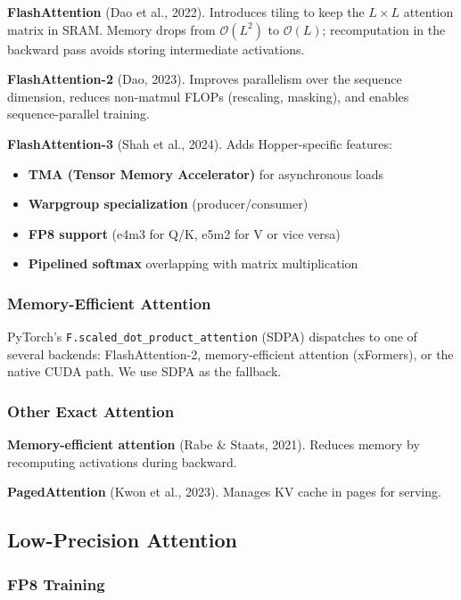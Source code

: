 \textbf{FlashAttention} (Dao et al., 2022). Introduces tiling to keep the 
$L \times L$ attention matrix in SRAM. Memory drops from $\mathcal{O}(L^2)$ 
to $\mathcal{O}(L)$; recomputation in the backward pass avoids storing 
intermediate activations.

\textbf{FlashAttention-2} (Dao, 2023). Improves parallelism over the sequence 
dimension, reduces non-matmul FLOPs (rescaling, masking), and enables 
sequence-parallel training.

\textbf{FlashAttention-3} (Shah et al., 2024). Adds Hopper-specific features:
\begin{itemize}
\item \textbf{TMA (Tensor Memory Accelerator)} for asynchronous loads
\item \textbf{Warpgroup specialization} (producer/consumer)
\item \textbf{FP8 support} (e4m3 for Q/K, e5m2 for V or vice versa)
\item \textbf{Pipelined softmax} overlapping with matrix multiplication

\end{itemize}
\subsubsection{Memory-Efficient Attention}

PyTorch's \texttt{F.scaled\_dot\_product\_attention} (SDPA) dispatches to one of 
several backends: FlashAttention-2, memory-efficient attention (xFormers), 
or the native CUDA path. We use SDPA as the fallback.

\subsubsection{Other Exact Attention}

\textbf{Memory-efficient attention} (Rabe \& Staats, 2021). Reduces memory by 
recomputing activations during backward.

\textbf{PagedAttention} (Kwon et al., 2023). Manages KV cache in pages for 
serving.

\subsection{Low-Precision Attention}

\subsubsection{FP8 Training}

